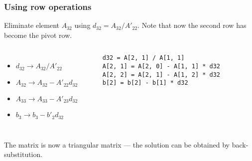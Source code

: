 \begin{frame}[fragile]
  \frametitle{Using row operations}
  Eliminate element $A_{32}$ using $d_{32}=A_{32}/A'_{22}$. Note that now the second row has become the pivot row.
  \vfill
  \vfill\pause
  \begin{columns}
  \begin{itemize}
    \item $d_{32}\rightarrow A_{32}/A'_{22}$
    \item $A_{32}\rightarrow A_{32}-A'_{22}d_{32}$
    \item $A_{33}\rightarrow A_{33}-A'_{23}d_{32}$
    \item $b_3   \rightarrow b_3   -b'_2   d_{32}$
  \end{itemize}
   \begin{lstlisting}
    d32 = A[2, 1] / A[1, 1]
    A[2, 1] = A[2, 0] - A[1, 1] * d32
    A[2, 2] = A[2, 1] - A[1, 2] * d32
    b[2] = b[2] - b[1] * d32    
   \end{lstlisting}
  \end{columns}
  \pause
  \vfill
  The matrix is now a triangular matrix --- the solution can be obtained by back-substitution.
\end{frame}

